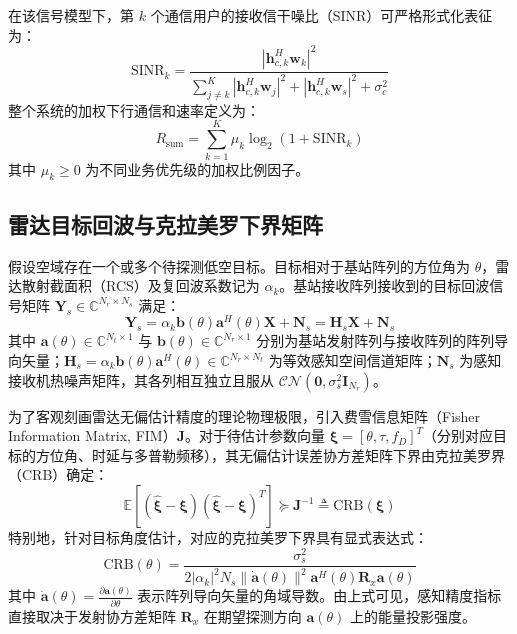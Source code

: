 在该信号模型下，第 $k$ 个通信用户的接收信干噪比（SINR）可严格形式化表征为：
\begin{equation}
  \mathrm{SINR}_k = \frac{|\mathbf{h}_{c,k}^H \mathbf{w}_k|^2}{\sum_{j \ne k}^K |\mathbf{h}_{c,k}^H \mathbf{w}_j|^2 + |\mathbf{h}_{c,k}^H \mathbf{w}_s|^2 + \sigma_c^2}
\end{equation}
整个系统的加权下行通信和速率定义为：
\begin{equation}
  R_{\mathrm{sum}} = \sum_{k=1}^K \mu_k \log_2(1 + \mathrm{SINR}_k)
\end{equation}
其中 $\mu_k \ge 0$ 为不同业务优先级的加权比例因子。

\subsection{雷达目标回波与克拉美罗下界矩阵}
假设空域存在一个或多个待探测低空目标。目标相对于基站阵列的方位角为 $\theta$，雷达散射截面积（RCS）及复回波系数记为 $\alpha_k$。基站接收阵列接收到的目标回波信号矩阵 $\mathbf{Y}_s \in \mathbb{C}^{N_r \times N_s}$ 满足：
\begin{equation}
  \mathbf{Y}_s = \alpha_k \mathbf{b}(\theta)\mathbf{a}^H(\theta)\mathbf{X} + \mathbf{N}_s = \mathbf{H}_s \mathbf{X} + \mathbf{N}_s
\end{equation}
其中 $\mathbf{a}(\theta) \in \mathbb{C}^{N_t \times 1}$ 与 $\mathbf{b}(\theta) \in \mathbb{C}^{N_r \times 1}$ 分别为基站发射阵列与接收阵列的阵列导向矢量；$\mathbf{H}_s = \alpha_k \mathbf{b}(\theta)\mathbf{a}^H(\theta) \in \mathbb{C}^{N_r \times N_t}$ 为等效感知空间信道矩阵；$\mathbf{N}_s$ 为感知接收机热噪声矩阵，其各列相互独立且服从 $\mathcal{CN}(\mathbf{0}, \sigma_s^2 \mathbf{I}_{N_r})$。

为了客观刻画雷达无偏估计精度的理论物理极限，引入费雪信息矩阵（Fisher Information Matrix, FIM）$\mathbf{J}$。对于待估计参数向量 $\boldsymbol{\xi} = [\theta, \tau, f_D]^T$（分别对应目标的方位角、时延与多普勒频移），其无偏估计误差协方差矩阵下界由克拉美罗界（CRB）确定：
\begin{equation}
  \mathbb{E}\left[(\hat{\boldsymbol{\xi}} - \boldsymbol{\xi})(\hat{\boldsymbol{\xi}} - \boldsymbol{\xi})^T\right] \succeq \mathbf{J}^{-1} \triangleq \mathrm{CRB}(\boldsymbol{\xi})
\end{equation}
特别地，针对目标角度估计，对应的克拉美罗下界具有显式表达式：
\begin{equation}
  \mathrm{CRB}(\theta) = \frac{\sigma_s^2}{2 |\alpha_k|^2 N_s \|\dot{\mathbf{a}}(\theta)\|^2 \mathbf{a}^H(\theta)\mathbf{R}_x \mathbf{a}(\theta)}
\end{equation}
其中 $\dot{\mathbf{a}}(\theta) = \frac{\partial \mathbf{a}(\theta)}{\partial \theta}$ 表示阵列导向矢量的角域导数。由上式可见，感知精度指标直接取决于发射协方差矩阵 $\mathbf{R}_x$ 在期望探测方向 $\mathbf{a}(\theta)$ 上的能量投影强度。
